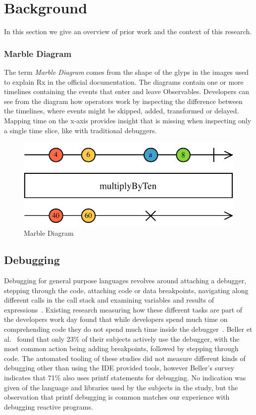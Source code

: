 \section{Background}
\label{background}
In this section we give an overview of prior work 
and the context of this research.



\subsubsection{Marble Diagram}
\label{marblediagram}
The term \textit{Marble Diagram} comes from the shape of the glyps in the images used to explain Rx in the official documentation. 
The diagrams contain one or more timelines containing the events that enter and leave Observables. 
Developers can see from the diagram how operators work by inspecting the difference between the timelines, 
where events might be skipped, added, transformed or delayed. 
Mapping time on the x-axis provides insight that is missing when inspecting only a single time slice, like with traditional debuggers.

\begin{figure}[ht]
\centering
\includegraphics[width=\columnwidth]{images/marble-diagram.pdf}
\caption{Marble Diagram}
\label{marblediagram-image}
\end{figure}

\subsection{Debugging}
Debugging for general purpose languages revolves around 
attaching a debugger, 
stepping through the code, 
attaching code or data breakpoints, 
navigating along different calls in the call stack and 
examining variables and results of expressions~\cite{Spinellis2017}.
Existing research measuring how these different tasks are part of the developers work day found that 
while developers spend much time on comprehending code they do not spend much time inside the debugger~\cite{minelli2015know}.
Beller et al.~\cite{beller2017behavior} found that only 23\% of their subjects actively use the debugger,
with the most common action being adding breakpoints, followed by stepping through code.
The automated tooling of these studies did not measure different kinds of debugging other than using the IDE provided tools, 
however Beller's survey indicates that 71\% also uses printf statements for debugging.  
No indication was given of the language and libraries used by the subjects in the study, 
but the observation that printf debugging is common matches our experience with debugging reactive programs.


